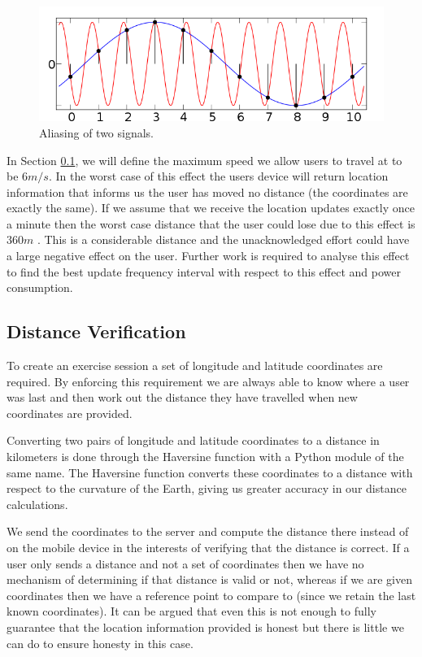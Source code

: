 \begin{figure}
  \centering
  \includegraphics[width=\textwidth]{images/aliasing.png}
  \caption{Aliasing of two signals. \cite{ailising}}
  \label{fig:ailising}
\end{figure} 

In Section \ref{sec:distance_ver}, we will define the maximum speed we
allow users to travel at to be $\text{6}m/s$. In the worst case of this
effect the users device will return location information that informs
us the user has moved no distance (the coordinates are exactly the
same). If we assume that we receive the location updates exactly once
a minute then the worst case distance that the user could lose due to
this effect is $\text{360}m$ . This is a considerable distance and the
unacknowledged effort could have a large negative effect on the
user. Further work is required to analyse this effect to find the best
update frequency interval with respect to this effect and power
consumption. 


\subsection{Distance Verification}
\label{sec:distance_ver}
To create an exercise session a set of longitude and latitude
coordinates are required. By enforcing this requirement we are always
able to know where a user was last and then work out the distance they
have travelled when new coordinates are provided. 

Converting two pairs of longitude and latitude coordinates to a
distance in kilometers is done through the Haversine
function\cite{haversine} with a Python module of the same
name\cite{python_haversine}. The Haversine function converts these
coordinates to a distance with respect to the curvature of the Earth,
giving us greater accuracy in our distance calculations.

We send the coordinates to the server and compute the distance there
instead of on the mobile device in the interests of verifying that
the distance is correct. If a user only sends a distance and not a
set of coordinates then we have no mechanism of determining if that
distance is valid or not, whereas if we are given coordinates then we
have a reference point to compare to (since we retain the last known
coordinates). It can be argued that even this is not enough to fully
guarantee that the location information provided is honest but there
is little we can do to ensure honesty in this case. 

